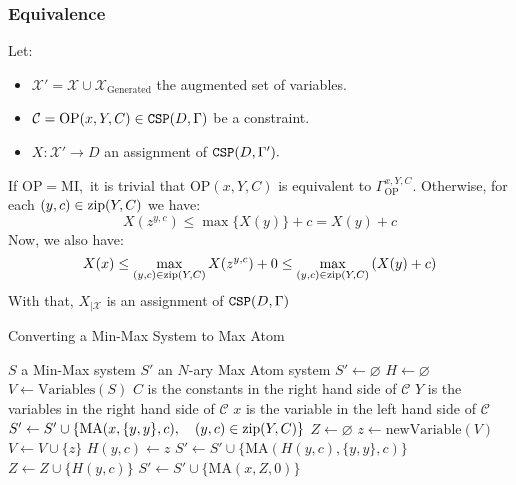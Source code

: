 \subsubsection{Equivalence}
Let:
\begin{itemize}
	\item $\mathcal{X}' = \mathcal{X}\cup \mathcal{X}_{\text{Generated}}$ the augmented set of variables.
	\item $\mathcal{C}=\text{OP}(x,Y,C)\in \operatorname{\mathtt{CSP}}(D,\Gamma)$ be a constraint.
	\item $X:\mathcal{X'}\rightarrow D$ an assignment of $\operatorname{\mathtt{CSP}}(D,\Gamma').$
\end{itemize}
If $\text{OP}=\text{MI},$ it is trivial that $\text{OP}(x,Y,C)$ is equivalent to $\Gamma^{x,Y,C}_{\text{OP}}.$
\newline Otherwise, for each $(y,c)\in \operatorname{zip}(Y,C)$ we have:
$$
X(z^{y,c}) \le \max\{X(y)\}+c = X(y)+c
$$
Now, we also have:
$$
X(x) \le \max_{(y,c)\in\operatorname{zip}(Y,C)}X(z^{y,c}) +0 \le \max_{(y,c)\in \operatorname{zip}(Y,C)}\left(X(y)+c\right)
$$
With that, $X_{\mid \mathcal{X}}$ is an assignment of $\operatorname{\mathtt{CSP}}(D,\Gamma)$
\begin{algorithm}
	\caption{Converting a Min-Max System to Max Atom}\label{alg:MinMaxToMaxAtom}
	\begin{algorithmic}
		\Require $S$ a Min-Max system
		\Ensure $S'$ an $N$-ary Max Atom system  
		\State $S'\leftarrow \varnothing$
		\State $H\leftarrow\varnothing$ 
		\State $V\leftarrow \text{Variables}(S)$  
		 \State $C$ is the constants in the right hand side of $\mathcal{C}$
		 \State $Y$ is the variables in the right hand side of $\mathcal{C}$
		 \State $x$ is the variable in the left hand side of $\mathcal{C}$
			\State $S'\leftarrow S'\cup\left\{\text{MA}(x,\{y,y\},c),\quad (y,c)\in \operatorname{zip}(Y,C)\right\}$
		\Else
			\State $Z\leftarrow \varnothing$
					\State $z\leftarrow \text{newVariable}(V)$ 
					\State $V\leftarrow V\cup\{z\}$
					\State $H(y,c)\leftarrow z$
				\EndIf
				\State $S'\leftarrow S'\cup\{\text{MA}(H(y,c),\{y,y\},c)\}$
				\State $Z\leftarrow Z\cup \{H(y,c)\} $
			\EndFor
			\State $S' \leftarrow S' \cup \{\text{MA}(x,Z,0)\}$
		\EndIf
		\EndFor
	\end{algorithmic}
\end{algorithm}

